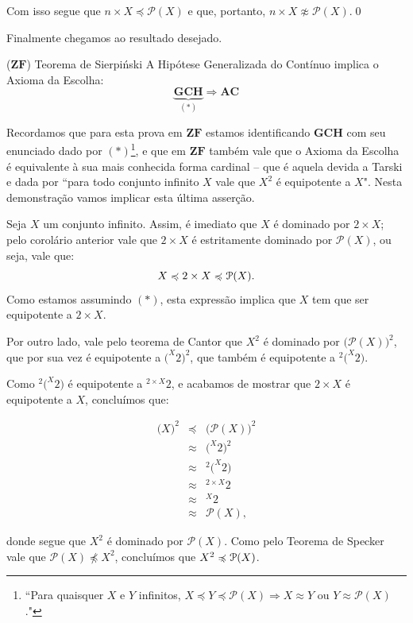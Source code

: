 \documentclass{hipatia}
\newcommand{\n}{\noindent}
\newcommand{\dem}{\n{\bf Demonstração: }}
\newcommand{\partes}[1]{\mathcal{P}(#1)}
\newcommand{\nback}[1][-.95pt]{
  \mathrel{\raisebox{#1}{$\rotatebox[origin=c]{-315}{\scaleobj{0.55}{-}}$}}
}
\newcommand{\preccurlyneq}{%
\mathrel{\ooalign{$\preccurlyeq$\cr\kern1.2pt$\nback$}}}
\newcommand{\gch}{\mathbf{GCH}}
\newcommand{\ac}{\mathbf{AC}}
\newcommand{\zf}{\mathbf{ZF}}
\begin{document}
Com isso segue que $n\times
X\preccurlyeq\partes{X}$ e que, portanto, $n\times
X\not\approx\partes{X}$.\qed

Finalmente chegamos ao resultado desejado.

\begin{teoremacaixa*}{($\zf$) Teorema de
Sierpi\'nski \cite{Sierp}} A Hipótese
Generalizada do Contínuo implica o Axioma da
Escolha:
$$\underbrace{\gch}_{(\ast)}\Longrightarrow\ac$$
\end{teoremacaixa*}

Recordamos que para esta prova em $\zf$ estamos
identificando $\gch$ com seu enunciado dado por
$(\ast)$\footnote{``Para quaisquer $X$ e $Y$
infinitos, $X \preccurlyeq Y
\preccurlyeq\mathcal{P}(X)\Longrightarrow X
\approx Y$ ou $Y \approx \mathcal{P}(X)$."}, e que
em $\zf$ também vale que o Axioma da Escolha é
equivalente à sua mais conhecida forma cardinal
-- que é aquela devida a Tarski e dada por
``para todo conjunto infinito $X$ vale que $X^2$ é
equipotente a $X$". Nesta demonstração vamos
implicar esta última asserção.

\dem Seja $X$ um conjunto infinito. Assim, é
imediato que $X$ é dominado por $2\times X$; pelo
corolário anterior vale que $2\times X$ é
estritamente dominado por $\partes{X}$, ou seja,
vale que: $$X\preccurlyeq 2\times
X\preccurlyneq\partes{X}.$$ Como estamos assumindo
$(\ast)$, esta expressão implica que $X$ tem que
ser equipotente a $2\times X$.

Por outro lado, vale pelo teorema de
Cantor que $X^2$  é dominado por $\big(\partes{X}\big)^2$,
que por sua vez é equipotente a $\big(^X2\big)^2$,
que também é equipotente a $^2\big(^X2\big)$.

Como $^2\big(^X2\big)$ é equipotente a $^{2\times
X}2$, e acabamos de mostrar que $2\times X$ é
equipotente a $X$, concluímos que:

$$\begin{matrix}
\big(X\big)^2&\preccurlyeq&\big(\partes{X}\big)^2
\\&\approx&\big(^X2\big)^2
\\&\approx&^2\big(^X2\big) \\&\approx&^{2\times
X}2 \\&\approx&^X2 \\&\approx&\partes{X},
\end{matrix}$$

donde segue que $X^2$ é dominado por $\partes{X}$.
Como pelo Teorema de Specker vale que
$\partes{X}\npreccurlyeq X^2$, concluímos que
$X^2\preccurlyneq\partes{X}$.
\end{document}
